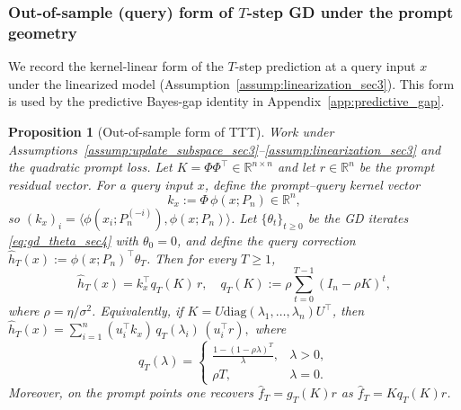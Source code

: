 \documentclass{article}
\theoremstyle{plain}
\newtheorem{proposition}[theorem]{Proposition}
\theoremstyle{definition}
\theoremstyle{remark}
\begin{document}
\subsubsection{Out-of-sample (query) form of $T$-step GD under the prompt geometry}
\label{app:out_of_sample_form}

We record the kernel-linear form of the $T$-step prediction at a query input $x$ under the linearized model
(Assumption~\ref{assump:linearization_sec3}). This form is used by the predictive Bayes-gap identity in
Appendix~\ref{app:predictive_gap}.

\begin{proposition}[Out-of-sample form of TTT]
\label{prop:out_of_sample_form_app}
Work under Assumptions~\ref{assump:update_subspace_sec3}--\ref{assump:linearization_sec3} and the quadratic prompt loss. Let $K=\Phi\Phi^\top\in\mathbb{R}^{n\times n}$ and let $r\in\mathbb{R}^n$ be the
prompt residual vector. For a query input $x$, define the prompt--query kernel vector
\begin{equation}
    k_x  :=  \Phi\,\phi(x;P_n)\in\mathbb{R}^n,
\label{eq:kx_def_app}
\end{equation}
so $(k_x)_i=\langle \phi(x_i;P_n^{(-i)}),\phi(x;P_n)\rangle$.
Let $\{\theta_t\}_{t\ge 0}$ be the GD iterates \eqref{eq:gd_theta_sec4} with $\theta_0=0$, and define the query correction
$\hat h_T(x):=\phi(x;P_n)^\top\theta_T$. Then for every $T\ge 1$,
\begin{equation}
\hat h_T(x)
=
k_x^\top q_T(K)\,r,
\quad
q_T(K):=\rho\sum_{t=0}^{T-1}(I_n-\rho K)^t,
\label{eq:out_of_sample_qT_app}
\end{equation}
where $\rho=\eta/\sigma^2$. Equivalently, if $K=U\mathrm{diag}(\lambda_1,\dots,\lambda_n)U^\top$, then $\hat h_T(x)=\sum_{i=1}^n (u_i^\top k_x)\,q_T(\lambda_i)\,(u_i^\top r),$ where
\begin{equation}
q_T(\lambda)=
\begin{cases}
\displaystyle \frac{1-(1-\rho\lambda)^T}{\lambda}, & \lambda>0,\\[1.2ex]
\rho T, & \lambda=0.
\end{cases}
\label{eq:out_of_sample_spectral_app}
\end{equation}
Moreover, on the prompt points one recovers $\hat f_T=g_T(K)r$ as $\hat f_T=K q_T(K) r$.
\end{proposition}
\end{document}
